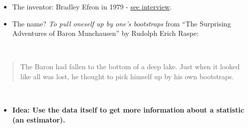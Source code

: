 \documentclass[
  10pt,
  ignorenonframetext,
]{beamer}
\providecommand{\tightlist}{%
  \setlength{\itemsep}{0pt}\setlength{\parskip}{0pt}}
\begin{document}
\begin{frame}
\begin{itemize}
\item
  The inventor: Bradley Efron in 1979 -
  \href{https://www.youtube.com/watch?v=6l9V1sINzhE}{see interview}.
\item
  The name? \emph{To pull oneself up by one's bootstraps} from ``The
  Surprising Adventures of Baron Munchausen'' by Rudolph Erich Raspe:
\end{itemize}

\(~\)

\begin{quote}
The Baron had fallen to the bottom of a deep lake. Just when it looked
like all was lost, he thought to pick himself up by his own bootstraps.
\end{quote}

\(~\)

\begin{itemize}
\tightlist
\item
  \textbf{Idea: Use the data itself to get more information about a
  statistic (an estimator).}
\end{itemize}
\end{frame}
\end{document}
